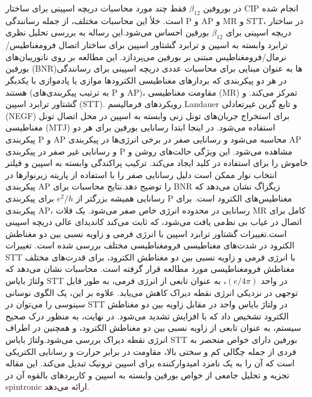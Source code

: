 در بوروفین $\beta_{12}$ فقط چند مورد محاسبات دریچه اسپینی برای ساختار \gls{CIP} انجام شده است. خلأ این محاسبات مختلف، از جمله رسانندگی \gls{P} و \gls{AP} و \gls{MR} و \gls{STT}، در ساختار  دریچه اسپینی برای $\beta_{12}$‌ بورفین احساس ‌می‌شود.این رساله به بررسی تحلیل نظری ترابرد وابسته به اسپین و ترابرد گشتاور اسپین برای  ساختار اتصال فرومغناطیس/نرمال/فرومغناطیس مبتنی بر ‌بورفین ‌می‌‌پردازد.  این مطالعه بر روی نانوریبان‌های ‌بورفین (\gls{BNR})ها به عنوان مبنایی برای محاسبات عددی دریچه اسپینی برای رسانندگی در هر دو پیکربندی که بردارهای مغناطیسی الکترودها موازی یا پاد‌موازی با یکدیگر هستند (به ترتیب پیکربندی‌های \gls{P} و \gls{AP})، مقاومت مغناطیسی (\gls{MR}) تمرکز ‌می‌کند. و گشتاور ترابرد اسپین (\gls{STT}). رویکردهای فرمالیسم \gls{Landauer} و تابع گرین غیرتعادلی (\gls{NEGF}) برای استخراج جریان‌های تونل زنی وابسته به اسپین در محل اتصال تونل مغناطیسی (\gls{MTJ}) استفاده ‌‌می‌‌شود. در اینجا ابتدا رسانایی ‌بورفین برای هر دو پیکربندی \gls{P} و \gls{AP} محاسبه ‌می‌شود و رسانایی صفر در برخی انرژی‌ها در پیکربندی \gls{AP} و رسانایی غیر صفر در پیکربندی \gls{P} مشاهده ‌می‌شود. این ویژگی حالت‌های روشن و خاموش را برای استفاده در کلید ایجاد ‌‌می‌‌کند. ترکیب پراکندگی وابسته به اسپین و فیلتر انتخاب نوار ممکن است دلیل رسانایی صفر را با استفاده از پاریته زیر‌نوارها در پیکربندی \gls{AP} را توضیح دهد.نتایج محاسبات برای \gls{BNR} زیگزاگ نشان ‌می‌دهد که رسانایی همیشه بزرگتر از $e^2/h$ برای پیکربندی \gls{P} مغناطیس‌های الکترود است. برای پیکربندی \gls{AP}، رسانایی در محدوده انرژی خاص صفر ‌‌می‌‌شود. یک فلات \gls{MR} کامل برای اتصال در غیاب بی نظ‌‌می‌‌ یافت ‌‌می‌‌شود، که ثابت ‌‌می‌‌کند کاندیدای عالی دریچه اسپینی است.تغییرات گشتاور ترابرد اسپین با انرژی فر‌‌می‌‌ و زاویه نسبی بین دو مغناطش الکترود در شدت‌های مغناطیسی فرومغناطیسی مختلف بررسی شده است. تغییرات \gls{STT} با انرژی فر‌‌می‌‌ و زاویه نسبی بین دو مغناطش الکترود، برای قدرت‌های مختلف مغناطش فرومغناطیسی مورد مطالعه قرار گرفته است. محاسبات نشان ‌‌می‌‌دهد که ولتاژ بایاس \gls{STT} در واحد $(e/4\pi)$، به عنوان تابعی از انرژی فر‌می‌، به طور قابل توجهی در نزدیکی انرژی نقطه دیراک کاهش ‌‌می‌‌یابد. علاوه بر این، یک الگوی نوسانی سینوسی را ‌‌می‌‌توان در \gls{STT} در ولتاژ بایاس واحد  در مقابل زاویه بین دو مغناطش الکترود تشخیص داد که با افزایش  تشدید ‌‌می‌‌شود. در نهایت، به منظور درک صحیح سیستم،  به عنوان تابعی از زاویه نسبی بین دو مغناطش الکترود، و همچنین در اطراف انرژی نقطه دیراک بررسی ‌می‌شود.ولتاژ بایاس \gls{STT} ‌بورفین دارای خواص منحصر به فردی از جمله چگالی کم و سختی بالا، مقاومت در برابر حرارت و رسانایی الکتریکی است که آن را به یک نامزد ا‌میدوارکننده برای اسپین ترونیک تبدیل ‌‌می‌‌کند. این مقاله تجزیه و تحلیل جامعی از خواص ‌بورفین وابسته به اسپین و کاربردهای بالقوه آن در \gls{spintronic} ارائه ‌‌می‌‌دهد.

